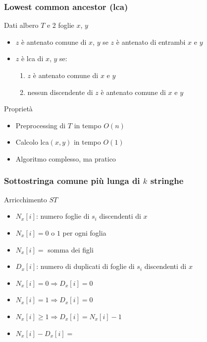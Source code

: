 \begin{frame}[fragile]
\frametitle{Lowest common ancestor (lca)}
\begin{block}{Dati albero $T$ e 2 foglie $x$, $y$}
\begin{itemize}
\item
$z$ è antenato comune di $x$, $y$ se
$z$ è antenato di entrambi $x$ e $y$
\item
$z$ è lca di $x$, $y$ se:
\begin{enumerate}
\item
$z$ è antenato comune di $x$ e $y$
\item
nessun discendente di $z$ è antenato comune di $x$ e $y$
\end{enumerate}
\end{itemize}
\end{block}
\begin{block}{Proprietà}
\begin{itemize}
\item
Preprocessing di $T$ in tempo $O(n)$
\item
Calcolo lca$(x,y)$ in tempo $O(1)$
\item
Algoritmo complesso, ma pratico
\end{itemize}
\end{block}
\end{frame}

\begin{frame}[fragile]
\frametitle{Sottostringa comune più lunga di $k$ stringhe}
\begin{block}{Arricchimento $ST$}
\begin{itemize}
\item
$N_{x}[i]$: numero foglie di $s_{i}$ discendenti di $x$
\item
$N_{x}[i]=0$ o $1$ per ogni foglia
\item
$N_{x}[i]=$ somma dei figli
\item
$D_{x}[i]$: numero di duplicati di foglie di $s_{i}$ discendenti di $x$
\item
$N_{x}[i]=0 \Rightarrow D_{x}[i]=0$
\item
$N_{x}[i]=1 \Rightarrow D_{x}[i]=0$
\item
$N_{x}[i]\ge 1 \Rightarrow D_{x}[i]=N_{x}[i]-1$
\item
$N_{x}[i] - D_{x}[i] =$ 
\end{itemize}
\end{block}
\end{frame}

